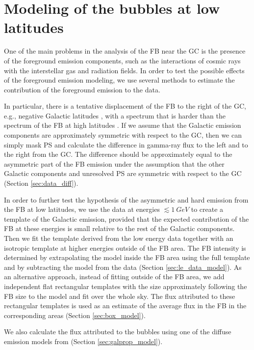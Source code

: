 
\section{Modeling of the \Fermi bubbles at low latitudes}

One of the main problems in the analysis of the FB near the GC is the 
presence of the foreground emission components, 
such as the interactions of cosmic rays with the interstellar gas and radiation fields.
In order to test the possible effects of the foreground emission modeling,
we use several methods to estimate the contribution of the foreground emission to the data.

In particular, there is a tentative
displacement of the FB to the right of the GC, e.g., negative Galactic latitudes \citep{2016ApJS..223...26A, 2017ApJ...840...43A},
with a spectrum that is harder than the spectrum of the FB at high latitudes \citep{2017ApJ...840...43A}.
If we assume that the Galactic emission components are approximately symmetric with respect to the GC,
then we can simply mask PS and calculate the difference in gamma-ray flux to the left and to the right from the GC.
The difference should be approximately equal to the asymmetric part of the FB emission
under the assumption that the other Galactic components and unresolved PS are symmetric with respect to the GC
(Section \ref{sec:data_diff}).

In order to further test the hypothesis of the asymmetric and hard emission from the FB at low latitudes,
we use the data at energies $\lesssim \SI{1}{GeV}$ to create a template of the Galactic emission,
provided that the expected contribution of the FB at these energies is small relative to the rest of the Galactic components.
Then we fit the template derived from the low energy data together with an isotropic template at higher energies
outside of the FB area.
The FB intensity is determined by extrapolating the model inside the FB area using the full template and by subtracting the model
from the data (Section \ref{sec:le_data_model}).
As an alternative approach, instead of fitting outside of the FB area, we add independent flat rectangular templates with the size
approximately following the FB size to the model and fit over the whole sky.
The flux attributed to these rectangular templates is used as an estimate of the average flux in the FB in the corresponding areas
(Section \ref{sec:box_model}).

We also calculate the flux attributed to the bubbles using one of the diffuse emission models from \citep{2017ApJ...840...43A}
(Section \ref{sec:galprop_model}).



